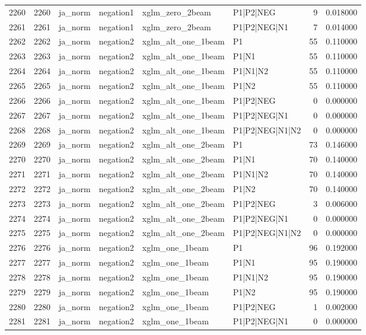 \begin{tabular}{lrllllrr}
2260 & 2260 & ja_norm & negation1 & xglm_zero_2beam & P1|P2|NEG & 9 & 0.018000 \\
2261 & 2261 & ja_norm & negation1 & xglm_zero_2beam & P1|P2|NEG|N1 & 7 & 0.014000 \\
2262 & 2262 & ja_norm & negation2 & xglm_alt_one_1beam & P1 & 55 & 0.110000 \\
2263 & 2263 & ja_norm & negation2 & xglm_alt_one_1beam & P1|N1 & 55 & 0.110000 \\
2264 & 2264 & ja_norm & negation2 & xglm_alt_one_1beam & P1|N1|N2 & 55 & 0.110000 \\
2265 & 2265 & ja_norm & negation2 & xglm_alt_one_1beam & P1|N2 & 55 & 0.110000 \\
2266 & 2266 & ja_norm & negation2 & xglm_alt_one_1beam & P1|P2|NEG & 0 & 0.000000 \\
2267 & 2267 & ja_norm & negation2 & xglm_alt_one_1beam & P1|P2|NEG|N1 & 0 & 0.000000 \\
2268 & 2268 & ja_norm & negation2 & xglm_alt_one_1beam & P1|P2|NEG|N1|N2 & 0 & 0.000000 \\
2269 & 2269 & ja_norm & negation2 & xglm_alt_one_2beam & P1 & 73 & 0.146000 \\
2270 & 2270 & ja_norm & negation2 & xglm_alt_one_2beam & P1|N1 & 70 & 0.140000 \\
2271 & 2271 & ja_norm & negation2 & xglm_alt_one_2beam & P1|N1|N2 & 70 & 0.140000 \\
2272 & 2272 & ja_norm & negation2 & xglm_alt_one_2beam & P1|N2 & 70 & 0.140000 \\
2273 & 2273 & ja_norm & negation2 & xglm_alt_one_2beam & P1|P2|NEG & 3 & 0.006000 \\
2274 & 2274 & ja_norm & negation2 & xglm_alt_one_2beam & P1|P2|NEG|N1 & 0 & 0.000000 \\
2275 & 2275 & ja_norm & negation2 & xglm_alt_one_2beam & P1|P2|NEG|N1|N2 & 0 & 0.000000 \\
2276 & 2276 & ja_norm & negation2 & xglm_one_1beam & P1 & 96 & 0.192000 \\
2277 & 2277 & ja_norm & negation2 & xglm_one_1beam & P1|N1 & 95 & 0.190000 \\
2278 & 2278 & ja_norm & negation2 & xglm_one_1beam & P1|N1|N2 & 95 & 0.190000 \\
2279 & 2279 & ja_norm & negation2 & xglm_one_1beam & P1|N2 & 95 & 0.190000 \\
2280 & 2280 & ja_norm & negation2 & xglm_one_1beam & P1|P2|NEG & 1 & 0.002000 \\
2281 & 2281 & ja_norm & negation2 & xglm_one_1beam & P1|P2|NEG|N1 & 0 & 0.000000 \\

\end{tabular}
